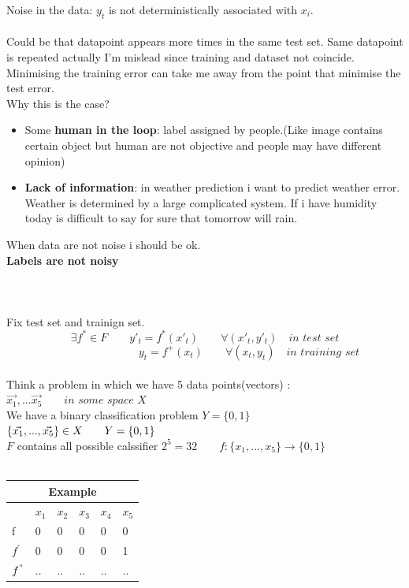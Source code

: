 \documentclass[../main.tex]{subfiles}
\begin{document}
Noise in the data: $y_t$ is not deterministically associated with $x_i$.\\\\
Could be that datapoint appears more times in the same test set.
Same datapoint is repeated actually I’m mislead since training and dataset not
coincide.
Minimising the training error can take me away from the point that minimise
the test error.\\
Why this is the case?
\begin{itemize}
\item Some \textbf{human in the loop}: label assigned by people.(Like image contains
certain object but human are not objective and people may have different
opinion)
\item \textbf{Lack of information}: in weather prediction i want to predict weather error.
Weather is determined by a large complicated system. If i have humidity
today is difficult to say for sure that tomorrow will rain.
\end{itemize}
When data are not noise i should be ok.
\\
\textbf{Labels are not noisy}\\\\\\\\
Fix test set and trainign set.
$$ \exists f^* \in F \qquad y'_t = f^*(x'_t) \qquad \forall (x'_t,y'_t)\quad \textit{in test set} $$
$$ \qquad \qquad \qquad \qquad  y_t = f^+(x_t) \qquad \forall (x_t,y_t) \quad \textit{in training set} 
$$
\\
Think a problem in which we have 5 data points(vectors) :\\
$
\vec{x_1},...\vec{x_5} \qquad \textit{in some space X}
$
\\
We have a binary classification problem $Y = \{0,1\}$
\\
$
\{ \vec{x_1},..., \vec{x_5} \} \in X \qquad Y= \{0,1\}\\
$
\\ $F$ contains all possible calssifier $2^5 = 32 \qquad f: \{x_1,...,x_5\} \rightarrow \{0,1\}
$
\\\\
\begin{tabular}{ |p{2cm}||p{2cm}|p{2cm}|p{2cm}|p{2cm}|p{2cm}|  }
 \hline
 \multicolumn{6}{|c|}{Example} \\
 \hline
  & $x_1$ & $x_2$ & $x_3$ & $x_4$ & $x_5$ \\
 \hline
 f   &0     &0 &   0  & 0& 0 \\
 $f^{'}$  &0     &0 &   0  & 0& 1 \\
 $f^" $ &..     &..&   .. &..& .. \\

 \hline
\end{tabular}
\end{document}
